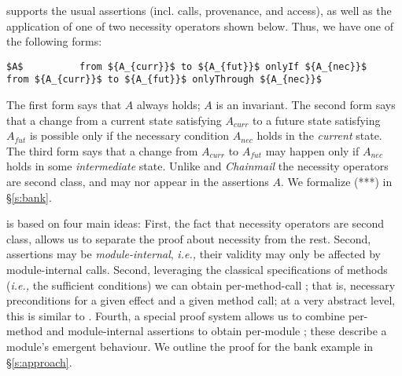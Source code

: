  

\Chainspec supports the usual assertions (incl. calls, provenance,
and access), as well as the application of one of two necessity operators shown below.
Thus, we  have one of the following forms:
\begin{lstlisting}[mathescape=true, language=chainmail, frame=lines]
       $A$          from ${A_{curr}}$ to ${A_{fut}}$ onlyIf ${A_{nec}}$          from ${A_{curr}}$ to ${A_{fut}}$ onlyThrough ${A_{nec}}$
\end{lstlisting}
%
The first form says that $A$ always holds;  $A$ is an invariant.
The second form says that  a change from a current state satisfying $A_{curr}$ to a future
state satisfying $A_{fut}$ %
is possible only if the necessary condition
$A_{nec}$ holds in the \emph{current} state.
The third form says that a change from %
$A_{curr}$ to %
$A_{fut}$  may happen only if %
$A_{nec}$ holds in some \emph{intermediate} state.
Unlike  {} and  \emph{Chainmail} 
 the necessity operators %
 are second class, and may nor appear in the assertions $A$.
We formalize (***) %
in  \S\ref{s:bank}.


 
\Chainlogic is based on four main ideas: 
First,  the fact that necessity operators are second class, allows us to 
 separate the proof about necessity from the rest.
 Second, assertions may be \emph{module-internal}, \textit{i.e.,}
their validity may only be affected by module-internal calls. 
Second, leveraging the classical  specifications of methods 
(\textit{i.e.,} the sufficient conditions) we can obtain per-method-call
 \NecessitySpecifications; that is, necessary preconditions
  for a given effect and a given method call;  at a very abstract level, this is
similar to  \cite{threoremsFreeSep}.
Fourth,  a special proof system allows us to combine 
per-method
 \NecessitySpecifications and module-internal assertions 
 to obtain per-module   \NecessitySpecifications; these describe a module's
 emergent behaviour.
We outline the proof for the bank example in  \S\ref{s:approach}.
 
